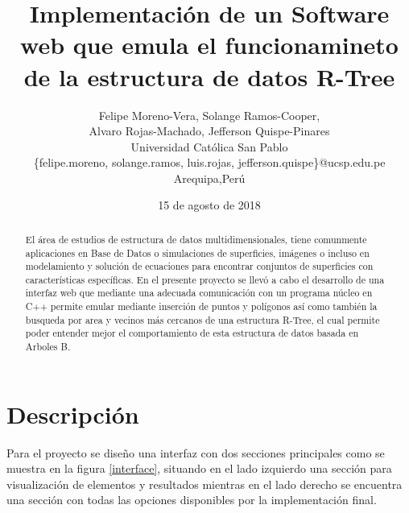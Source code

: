 \documentclass[a4paper]{article}
\title{Implementación de un Software web que emula el funcionamineto de la estructura de datos R-Tree}
\author{Felipe Moreno-Vera, Solange Ramos-Cooper,  \\
  Alvaro Rojas-Machado, Jefferson Quispe-Pinares\\
  \small Universidad Católica San Pablo\\
  \small \{felipe.moreno, solange.ramos, luis.rojas, jefferson.quispe\}@ucsp.edu.pe\\
  \small Arequipa,Perú
  \date{15 de agosto de 2018}
}
\begin{document}
\maketitle

 
\begin{abstract}
El área de estudios de estructura de datos multidimensionales, tiene comunmente aplicaciones en Base de Datos o simulaciones de superficies, imágenes o incluso en modelamiento y solución de ecuaciones para encontrar conjuntos de superficies con características específicas.
En el presente proyecto se llevó a cabo el desarrollo de una interfaz web que mediante una adecuada comunicación con un programa núcleo en C++ permite emular mediante inserción de puntos y polígonos así como también la busqueda por area y vecinos más cercanos de una estructura R-Tree, el cual permite poder entender mejor el comportamiento de esta estructura de datos basada en Arboles B.

\end{abstract}


\section{Descripción}

Para el proyecto se diseño una interfaz con dos secciones principales como se muestra en la figura \ref{interface}, situando en el lado izquierdo una sección para visualización de elementos y resultados mientras en el lado derecho se encuentra una sección con todas las opciones disponibles por la implementación final.\\
\end{document}

